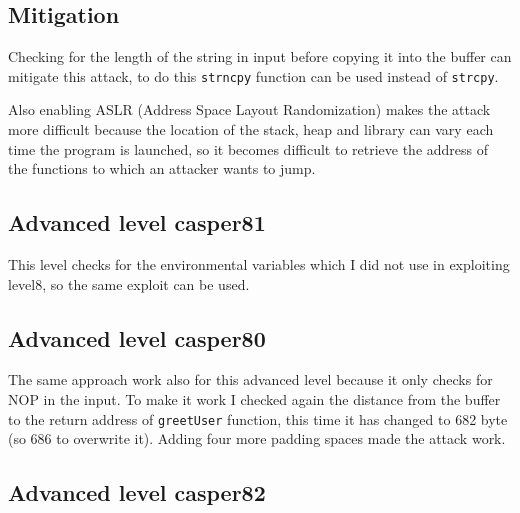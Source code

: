 \documentclass[a4paper,12pt]{article}
\begin{document}

\subsection{Mitigation}

Checking for the length of the string in input before copying it into the buffer can mitigate this attack, to do this \texttt{strncpy} function can be used instead of \texttt{strcpy}.

Also enabling ASLR (Address Space Layout Randomization) makes the attack more difficult because the location of the stack, heap and library can vary each time the program is launched, so it becomes difficult to retrieve the address of the functions to which an attacker wants to jump.

\subsection{Advanced level casper81}

This level checks for the environmental variables which I did not use in exploiting level8, so the same exploit can be used.

\subsection{Advanced level casper80}

The same approach work also for this advanced level because it only checks for NOP in the input. To make it work I checked again the distance from the buffer to the return address of \texttt{greetUser} function, this time it has changed to 682 byte (so 686 to overwrite it). Adding four more padding spaces made the attack work.



\subsection{Advanced level casper82}
\end{document}
